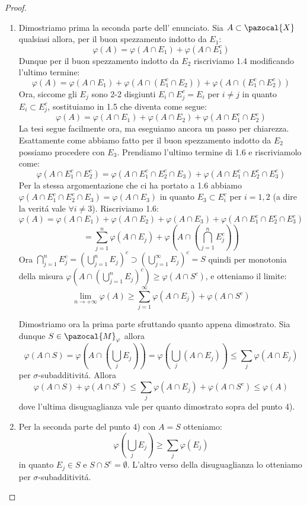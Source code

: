 \documentclass[11pt,a4paper]{report}
\theoremstyle{plain}
\theoremstyle{definition}
\newcommand{\M}{\pazocal{M}_\varphi}
\newcommand{\X}{\pazocal{X}}
\begin{document}
\begin{proof}
\begin{enumerate}
	\item Dimostriamo prima la seconda parte dell' enunciato. Sia $A \subset \X$ qualsiasi allora, per il buon spezzamento indotto da $E_1$:
	\begin{equation}
		\varphi(A) = \varphi(A \cap E_1) + \varphi(A \cap E_1^c)
	\end{equation}
 Dunque per il buon spezzamento indotto da $E_2$ riscriviamo 1.4 modificando l'ultimo termine:
	\begin{equation}
		\varphi(A) = \varphi(A \cap E_1) + \varphi(A \cap (E_1^c \cap E_2)) + \varphi(A \cap (E_1^c \cap E_2^c))
	\end{equation}
Ora, siccome gli $E_j$ sono 2-2 disgiunti $E_i \cap E_j^c = E_i$ per $i \ne j$ in quanto $E_i \subset E_j^c$, sostituiamo in 1.5 che diventa come segue:
	\begin{equation}
		\varphi(A) = \varphi(A \cap E_1) + \varphi(A \cap E_2) + \varphi(A \cap E_1^c \cap E_2^c)
	\end{equation}
La tesi segue facilmente ora, ma eseguiamo ancora un passo per chiarezza.
Esattamente come abbiamo fatto per il buon spezzamento indotto da $E_2$ possiamo procedere con $E_3$. Prendiamo l'ultimo termine di 1.6 e riscriviamolo come:
	\[
		\varphi(A \cap E_1^c \cap E_2^c) = \varphi(A \cap E_1^c \cap E_2^c \cap E_3) + \varphi(A \cap E_1^c \cap E_2^c \cap E_3^c)
	\]
	Per la stessa argomentazione che ci ha portato a 1.6 abbiamo $\varphi(A \cap E_1^c \cap E_2^c \cap E_3) = \varphi(A \cap E_3)$ in quanto $E_3 \subset E_i^c$ per $i=1,2$ (a dire la verit\'a vale $\forall i \ne 3$). Riscriviamo 1.6:	
	\[
		\varphi(A) = \varphi(A \cap E_1) + \varphi(A \cap E_2) + \varphi(A \cap E_3) + \varphi(A \cap E_1^c \cap E_2^c \cap E_3^c)
	\]
	\[
		= \sum\limits_{j=1}^n\varphi(A \cap E_j) + \varphi(A \cap (\bigcap\limits_{j=1}^n E_j^c))
	\]
	Ora $\bigcap\limits_{j=1}^nE_j^c = (\bigcup\limits_{j=1}^nE_j)^c \supset (\bigcup\limits_{j=1}^\infty E_j)^c = S$ quindi per monotonia della misura $\varphi(A \cap (\bigcup\limits_{j=1}^nE_j)^c) \ge \varphi(A \cap S^c)$, e otteniamo il limite:
	\begin{equation}
		\lim\limits_{n \rightarrow +\infty}\varphi(A) \ge \sum\limits_{j=1}^\infty\varphi(A \cap E_j) + \varphi(A \cap S^c)
	\end{equation}

Dimostriamo ora la prima parte sfruttando quanto appena dimostrato.
Sia dunque $S \in \M$ allora 
\[\varphi(A \cap S) = \varphi(A \cap (\bigcup\limits_{j}E_j)) = \varphi(\bigcup\limits_{j}(A \cap E_j)) \le \sum\limits_{j}\varphi(A \cap E_j)\]
per $\sigma$-subadditivit\'a.
Allora 
\[\varphi(A \cap S) +  \varphi(A \cap S^c) \le \sum\limits_{j}\varphi(A \cap E_j) + \varphi(A \cap S^c) \le \varphi(A)\] dove l'ultima disuguaglianza vale per quanto dimostrato sopra del punto 4). 

\item Per la seconda parte del punto 4) con $A=S$ otteniamo:
	\[
		\varphi(\bigcup\limits_{j}E_j) \ge \sum\limits_{j}\varphi(E_j)
	\]
	in quanto $E_j \in S$ e $S \cap S^c = \emptyset$.
L'altro verso della disuguaglianza lo otteniamo per $\sigma$-subadditivit\'a.
\end{enumerate}
\end{proof}
\end{document}

